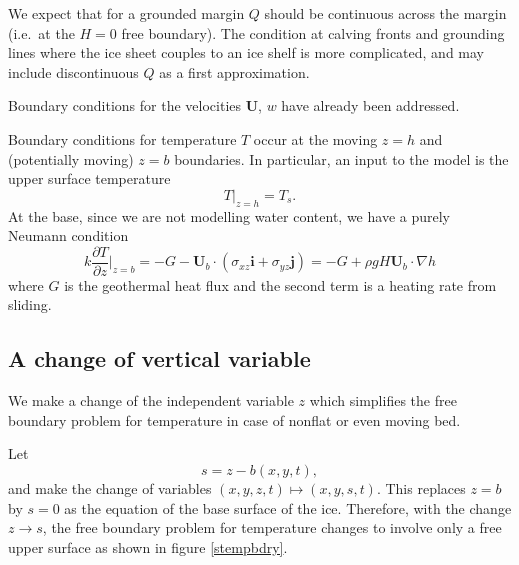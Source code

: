 \documentclass[12pt,final]{amsart}%
\theoremstyle{plain}
\theoremstyle{definition}
\theoremstyle{remark}
\newcommand{\ddz}[1]{\ensuremath{\frac{\partial #1}{\partial z}}}
\newcommand{\grad}{\nabla}
\newcommand{\ihat}{\mathbf{i}}
\newcommand{\jhat}{\mathbf{j}}
\newcommand{\bU}{{\mathbf{U}}}
\begin{document}
We expect that for a grounded margin $Q$ should be continuous across the margin (i.e.~at the $H=0$ free boundary).  The condition at calving fronts and grounding lines where the ice sheet couples to an ice shelf is more complicated, and may include discontinuous $Q$ as a first approximation.

Boundary conditions for the velocities $\bU$, $w$ have already been addressed.

Boundary conditions for temperature $T$ occur at the moving $z=h$ and (potentially moving) $z=b$ boundaries.  In particular, an input to the model is the upper surface temperature
    $$T\big|_{z=h} = T_s.$$
At the base, since we are not modelling water content, we have a purely Neumann condition \citep{Huybrechts90}
\begin{equation}\label{tempbasecond}
k\ddz{T}\Big|_{z=b} = -G -\bU_b\cdot(\sigma_{xz}\ihat + \sigma_{yz}\jhat) = -G+\rho g H \bU_b\cdot \grad h
\end{equation}
where $G$ is the geothermal heat flux and the second term is a heating rate from sliding.

\newcommand{\bUb}{{\mathbf{U}_b}}
\newcommand{\alphaav}{{\alpha_{\text{av}}}}
\newcommand{\Dav}{{D_{\text{av}}}}
\newcommand{\deltaav}{{\delta_{\text{av}}}}
\newcommand{\bUav}{{\mathbf{U}_{\text{av}}}}
\newcommand{\bUbav}{{\mathbf{U}_{b,\text{av}}}}
\newcommand{\wav}{{w_{\text{av}}}}
\newcommand{\hav}{{h_{\text{av}}}}
\newcommand{\sigmaav}{{\sigma_{\text{av}}}}
\newcommand{\alphatemp}{{\alpha_{\text{temp}}}}
\newcommand{\wtemp}{{w_{\text{temp}}}}
\newcommand{\deltatemp}{{\delta_{\text{temp}}}}
\newcommand{\htemp}{{h_{\text{temp}}}}
\newcommand{\Htemp}{{H_{\text{temp}}}}
\newcommand{\gradhtemp}{{\grad h_{\text{temp}}}}
\newcommand{\Itemp}{{I_{\text{temp}}}}
\newcommand{\Jtemp}{{J_{\text{temp}}}}
\newcommand{\Dtemp}{{D_{\text{temp}}}}
\newcommand{\sigmatemp}{{\sigma_{\text{temp}}}}
\newcommand{\bUbtemp}{{\mathbf{U}_{b,\text{temp}}}}
\newcommand{\Dold}{{D_{\text{old}}}}

\subsection*{A change of vertical variable}  We make a change of the independent variable $z$ which simplifies the free boundary problem for temperature in case of nonflat or even moving bed.

Let
    $$s=z-b(x,y,t),$$
and make the change of variables $(x,y,z,t)\mapsto (x,y,s,t)$.  This replaces $z=b$ by $s=0$ as the equation of the base surface of the ice.  Therefore, with the change $z\to s$, the free boundary problem for temperature changes to involve only a free upper surface as shown in figure \ref{stempbdry}.
\end{document}
